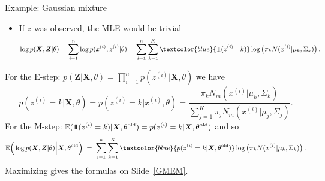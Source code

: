 \documentclass[11pt,handout,aspectratio=169]{beamer}
\begin{document}
\begin{frame}{Example: Gaussian mixture}
\begin{itemize}
	\item If $z$ was observed, the MLE would be trivial
	$${\small \log p(\boldsymbol X,\boldsymbol Z|\theta)=\sum_{i=1}^n \log p(x^{(i)},z^{(i)}|\theta)=\sum_{i=1}^n\sum_{k=1}^K \textcolor{blue}{1\!\!1(z^{(i)}\!=\!k)}\log\left(\pi_kN(x^{(i)}|\mu_k,\Sigma_k)\right).}$$
\end{itemize}
For the E-step: $p(\boldsymbol{Z}|\boldsymbol{X},\theta)=\prod_{i=1}^n p(z^{(i)}|\boldsymbol{X},\theta)$ we have
$$
p(z^{(i)}=k|\boldsymbol{X},\theta)=p(z^{(i)}=k|x^{(i)},\theta)=\frac{\pi_k N_m(x^{(i)}|\mu_k,\Sigma_k)}{\sum_{j=1}^K \pi_j N_m(x^{(i)}|\mu_j,\Sigma_j)}.
$$
For the M-step: ${\small \mathbb E(1\!\!1(z^{(i)}=k)|\boldsymbol{X},\theta^{\rm old})=p(z^{(i)}=k|\boldsymbol{X},\theta^{\rm old})}$ and so 
$$
{\small \mathbb E\Big(\log p(\boldsymbol X,\boldsymbol Z|\theta)\Big|\boldsymbol{X},\theta^{\rm old}\Big)\;=\;\sum_{i=1}^n\sum_{k=1}^K \textcolor{blue}{p(z^{(i)}=k|\boldsymbol{X},\theta^{\rm old})}\log\left(\pi_kN(x^{(i)}|\mu_k,\Sigma_k)\right).}
$$
Maximizing gives the formulas on Slide~\ref{GMEM}.
\end{frame}
\end{document}
